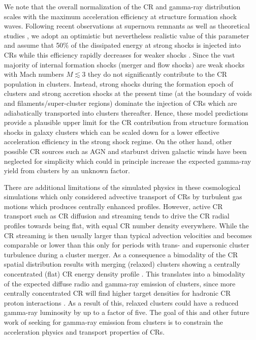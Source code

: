 \documentclass[12pt,manuscript]{aastex}
\begin{document}
We note that the overall normalization of the CR and gamma-ray distribution
scales with the maximum acceleration efficiency at structure formation shock
waves. Following recent observations at supernova remnants
\cite{2009Sci...325..719H} as well as theoretical studies
\cite{2005ApJ...620...44K}, we adopt an optimistic but nevertheless realistic
value of this parameter and assume that 50\% of the dissipated energy at strong
shocks is injected into CRs while this efficiency rapidly decreases for weaker
shocks \cite{2007A&A...473...41E}. Since the vast majority of internal formation
shocks (merger and flow shocks) are weak shocks with Mach numbers $M\lesssim3$
\citep[e.g.,][]{2003ApJ...593..599R,2006MNRAS.367..113P} they do not
significantly contribute to the CR population in clusters. Instead, strong
shocks during the formation epoch of clusters and strong accretion shocks at the
present time (at the boundary of voids and filaments/super-cluster regions)
dominate the injection of CRs which are adiabatically transported into clusters
thereafter. Hence, these model predictions provide a plausible upper limit for
the CR contribution from structure formation shocks in galaxy clusters which can
be scaled down for a lower effective acceleration efficiency in the strong shock
regime.  On the other hand, other possible CR sources such as AGN and starburst
driven galactic winds have been neglected for simplicity which could in
principle increase the expected gamma-ray yield from clusters by an unknown
factor.

There are additional limitations of the simulated physics in these cosmological
simulations which only considered advective transport of CRs by turbulent gas
motions which produces centrally enhanced profiles.  However, active CR
transport such as CR diffusion and streaming tends to drive the CR radial
profiles towards being flat, with equal CR number density everywhere. While the
CR streaming is then usually larger than typical advection velocities and
becomes comparable or lower than this only for periods with trans- and
supersonic cluster turbulence during a cluster merger. As a consequence a
bimodality of the CR spatial distribution results with merging (relaxed)
clusters showing a centrally concentrated (flat) CR energy density profile
\cite{2011A&A...527A..99E}.  This translates into a bimodality of the expected
diffuse radio and gamma-ray emission of clusters, since more centrally
concentrated CR will find higher target densities for hadronic CR proton
interactions \cite{2011A&A...527A..99E}. As a result of this, relaxed clusters
could have a reduced gamma-ray luminosity by up to a factor of five. The goal of
this and other future work of seeking for gamma-ray emission from clusters is to
constrain the acceleration physics and transport properties of CRs.
\end{document}
